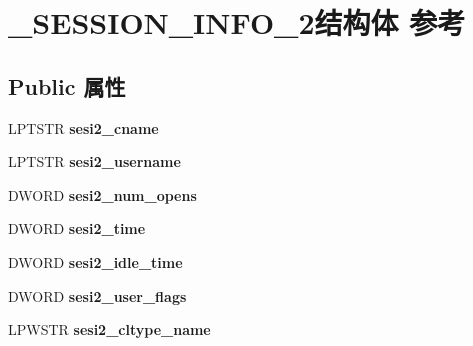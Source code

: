 \hypertarget{struct___s_e_s_s_i_o_n___i_n_f_o__2}{}\section{\+\_\+\+S\+E\+S\+S\+I\+O\+N\+\_\+\+I\+N\+F\+O\+\_\+2结构体 参考}
\label{struct___s_e_s_s_i_o_n___i_n_f_o__2}
\subsection*{Public 属性}
\begin{DoxyCompactItemize}
\item 
\mbox{\label{struct___s_e_s_s_i_o_n___i_n_f_o__2_a25bf9733f1a77572595d538c6ceb253f}} 
L\+P\+T\+S\+TR {\bfseries sesi2\+\_\+cname}
\item 
\mbox{\label{struct___s_e_s_s_i_o_n___i_n_f_o__2_a77618838399d43b6d96861e5ebcaf275}} 
L\+P\+T\+S\+TR {\bfseries sesi2\+\_\+username}
\item 
\mbox{\label{struct___s_e_s_s_i_o_n___i_n_f_o__2_aa073c7375cf1ddf7f14689d760efcc2e}} 
D\+W\+O\+RD {\bfseries sesi2\+\_\+num\+\_\+opens}
\item 
\mbox{\label{struct___s_e_s_s_i_o_n___i_n_f_o__2_aa3fa4f4c8a64c7f7ba576e7da09654fa}} 
D\+W\+O\+RD {\bfseries sesi2\+\_\+time}
\item 
\mbox{\label{struct___s_e_s_s_i_o_n___i_n_f_o__2_a99ce84886fd0a1b694807933318a7bcf}} 
D\+W\+O\+RD {\bfseries sesi2\+\_\+idle\+\_\+time}
\item 
\mbox{\label{struct___s_e_s_s_i_o_n___i_n_f_o__2_aef7c69799e4d1c076262b402ebd878f5}} 
D\+W\+O\+RD {\bfseries sesi2\+\_\+user\+\_\+flags}
\item 
\mbox{\label{struct___s_e_s_s_i_o_n___i_n_f_o__2_a088bf29fe89ab1519beabbaa8da03b3f}} 
L\+P\+W\+S\+TR {\bfseries sesi2\+\_\+cltype\+\_\+name}
\item 
\mbox{\label{struct___s_e_s_s_i_o_n___i_n_f_o__2_a062d3480b15153bbced0a2eb5c730ed2}} 

\end{DoxyCompactItemize}
